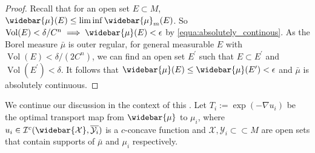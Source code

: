 \begin{proof}
	Recall that for an open set $E \subset M$, $\widebar{\mu}(E) \leq \liminf \widebar{\mu}_m(E)$.
	So
	$\operatorname{Vol}(E) < \delta / C^n \implies \widebar{\mu}(E) < \epsilon$
	by \cref{equa:absolutely_continous}.
	As the Borel measure $\bar{\mu}$ is outer regular, for general measurable $E$ with
	$\operatorname{Vol}(E) < \delta / (2C^n)$,
	we can find an open set $E^\prime$ such that
	$ E \subset E^\prime$ and $ \operatorname{Vol}(E^\prime) < \delta$.
	It follows that $\widebar{\mu}(E) \leq \widebar{\mu}(E^\prime) < \epsilon$
	and $\bar{\mu}$ is absolutely continuous.
\end{proof}

We continue our discussion in the context of this .
Let $T_i:=\exp(-\nabla u_i)$ be the optimal transport map from $\widebar{\mu}$ to $\mu_i$,
where $u_i \in \mathcal{I}^c(\widebar{\mathcal{X}}, \overline{\mathcal{Y}_i})$ is a $c$-concave function
and $\mathcal{X}, \mathcal{Y}_i \subset \subset M$ are open sets that contain supports of
$\bar{\mu}$ and $\mu_i$ respectively.

